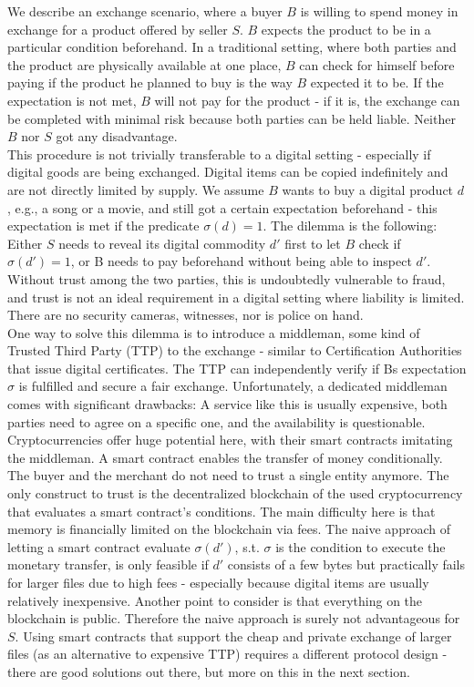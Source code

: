 \documentclass{cacthesis}
\newcounter{protocol}
\begin{document}
        We describe an exchange scenario, where a buyer $B$ is willing to spend money in exchange for a product offered by seller $S$. $B$ expects the product to be in a particular condition beforehand. In a traditional setting, where both parties and the product are physically available at one place, $B$ can check for himself before paying if the product he planned to buy is the way $B$ expected it to be. If the expectation is not met, $B$ will not pay for the product - if it is, the exchange can be completed with minimal risk because both parties can be held liable. Neither $B$ nor $S$ got any disadvantage. \\
        This procedure is not trivially transferable to a digital setting - especially if digital goods are being exchanged. Digital items can be copied indefinitely and are not directly limited by supply. We assume $B$ wants to buy a digital product $d$, e.g., a song or a movie, and still got a certain expectation beforehand - this expectation is met if the predicate $\sigma\left( d\right) =1$. The dilemma is the following: Either $S$ needs to reveal its digital commodity $d'$ first to let $B$ check if $\sigma\left( d'\right) =1$, or B needs to pay beforehand without being able to inspect $d'$. Without trust among the two parties, this is undoubtedly vulnerable to fraud, and trust is not an ideal requirement in a digital setting where liability is limited. There are no security cameras, witnesses, nor is police on hand. \\ 
        One way to solve this dilemma is to introduce a middleman, some kind of Trusted Third Party (TTP) to the exchange - similar to Certification Authorities that issue digital certificates. The TTP can independently verify if Bs expectation $\sigma$ is fulfilled and secure a fair exchange. Unfortunately, a dedicated middleman comes with significant drawbacks: A service like this is usually expensive, both parties need to agree on a specific one, and the availability is questionable. \\
        Cryptocurrencies offer huge potential here, with their smart contracts imitating the middleman. A smart contract enables the transfer of money conditionally. The buyer and the merchant do not need to trust a single entity anymore. The only construct to trust is the decentralized blockchain of the used cryptocurrency that evaluates a smart contract's conditions. The main difficulty here is that memory is financially limited on the blockchain via fees. The naive approach of letting a smart contract evaluate $\sigma\left( d'\right)$, s.t. $\sigma$ is the condition to execute the monetary transfer, is only feasible if $d'$ consists of a few bytes but practically fails for larger files due to high fees - especially because digital items are usually relatively inexpensive. Another point to consider is that everything on the blockchain is public. Therefore the naive approach is surely not advantageous for $S$. Using smart contracts that support the cheap and private exchange of larger files (as an alternative to expensive TTP) requires a different protocol design - there are good solutions out there, but more on this in the next section.   \\ 
\end{document}
